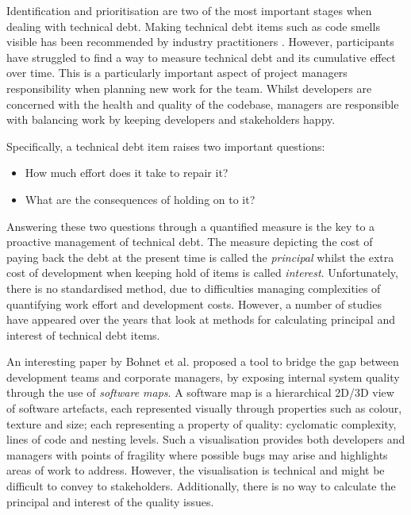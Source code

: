 \documentclass{mprop}
\begin{document}

Identification and prioritisation are two of the most important stages when
dealing with technical debt. Making technical debt items such as code smells
visible has been recommended by industry practitioners \cite{Lim2012}
\cite{Codabux2013}. However, participants have struggled to find a way to
measure technical debt and its cumulative effect over time. This is a
particularly important aspect of project managers responsibility when planning
new work for the team. Whilst developers are concerned with the health and
quality of the codebase, managers are responsible with balancing work by keeping
developers and stakeholders happy.

Specifically, a technical debt item raises two important questions:
\begin{itemize}
	\item How much effort does it take to repair it?
	\item What are the consequences of holding on to it?
\end{itemize}

Answering these two questions through a quantified measure is the key to a
proactive management of technical debt. The measure depicting the cost of paying
back the debt at the present time is called the \textit{principal} whilst the
extra cost of development when keeping hold of items is called
\textit{interest}. Unfortunately, there is no standardised method, due to
difficulties managing complexities of quantifying work effort and development
costs. However, a number of studies have appeared over the years that look at
methods for calculating principal and interest of technical debt items.

An interesting paper by Bohnet et al. \cite{Bohnet2011} proposed a tool to
bridge the gap between development teams and corporate managers, by exposing
internal system quality through the use of \textit{software maps}. A software
map is a hierarchical 2D/3D view of software artefacts, each represented
visually through properties such as colour, texture and size; each representing
a property of quality: cyclomatic complexity, lines of code and nesting levels.
Such a visualisation provides both developers and managers with points of
fragility where possible bugs may arise and highlights areas of work to address.
However, the visualisation is technical and might be difficult to convey to
stakeholders. Additionally, there is no way to calculate the principal and
interest of the quality issues.   
\end{document}
